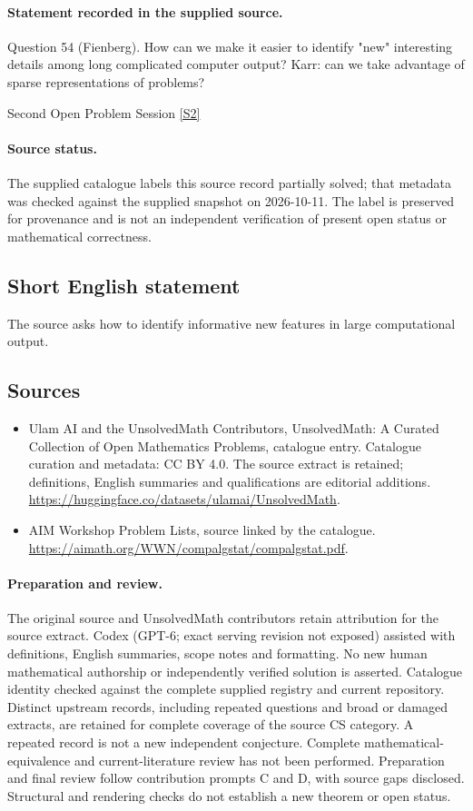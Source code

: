 \documentclass[11pt]{article}
\begin{document}
\paragraph{Statement recorded in the supplied source.}
Question 54 (Fienberg). How can we make it easier to identify "new" interesting details among long complicated computer output? Karr: can we take advantage of sparse representations of problems?

Second Open Problem Session \href{https://aimath.org/WWN/compalgstat/compalgstat.pdf}{[S2]}
\paragraph{Source status.}
The supplied catalogue labels this source record partially solved; that metadata was checked against the supplied snapshot on 2026-10-11. The label is preserved for provenance and is not an independent verification of present open status or mathematical correctness.
\subsection{Short English statement}
The source asks how to identify informative new features in large computational output.
\subsection{Sources}
\begin{itemize}
\item[S1] Ulam AI and the UnsolvedMath Contributors, UnsolvedMath: A Curated Collection of Open Mathematics Problems, catalogue entry. Catalogue curation and metadata: CC BY 4.0. The source extract is retained; definitions, English summaries and qualifications are editorial additions.
\url{https://huggingface.co/datasets/ulamai/UnsolvedMath}.
\item[S2] AIM Workshop Problem Lists, source linked by the catalogue.
\url{https://aimath.org/WWN/compalgstat/compalgstat.pdf}.
\end{itemize}
\paragraph{Preparation and review.}
The original source and UnsolvedMath contributors retain attribution for the source extract. Codex (GPT-6; exact serving revision not exposed) assisted with definitions, English summaries, scope notes and formatting. No new human mathematical authorship or independently verified solution is asserted. Catalogue identity checked against the complete supplied registry and current repository. Distinct upstream records, including repeated questions and broad or damaged extracts, are retained for complete coverage of the source CS category. A repeated record is not a new independent conjecture. Complete mathematical-equivalence and current-literature review has not been performed. Preparation and final review follow contribution prompts C and D, with source gaps disclosed. Structural and rendering checks do not establish a new theorem or open status.
\label{end:statement}
\end{document}
